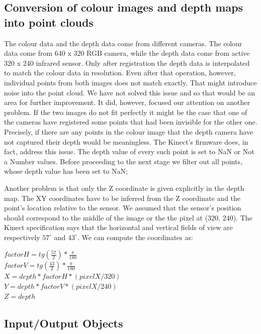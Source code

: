 	\subsection{Conversion of colour images and depth maps into point clouds}
	
		The colour data and the depth data come from different cameras. The colour data come from 640 x 320 RGB camera, while the depth data come from active 320 x 240 infrared sensor. Only after registration the depth data is interpolated to match the colour data in resolution. Even after that operation, however, individual points from both images does not match exactly. That might introduce noise into the point cloud. We have not solved this issue and so that would be an area for further improvement. It did, however, focused our attention on another problem. If the two images do not fit perfectly it might be the case that one of the cameras have registered some points that had been invisible for the other one. Precisely, if there are any points in the colour image that the depth camera have not captured their depth would be meaningless. The Kinect's firmware does, in fact, address this issue. The depth value of every such point is set to NaN or Not a Number values. Before proceeding to the next stage we filter out all points, whose depth value has been set to NaN;
		
		Another problem is that only the Z coordinate is given explicitly in the depth map. The XY coordinates have to be inferred from the Z coordinate and the point's location relative to the sensor. We assumed that the sensor's position should correspond to the middle of the image or the the pixel at (320, 240). The Kinect specification says that the horizontal and vertical fields of view are respectively $57^{\circ}$ and $43^{\circ}$. We can compute the coordinates as: \\
		
		\begin{centering}
			$factorH = tg (\frac{57}{2}) * \frac{\pi}{180}$\\
			$factorV = tg (\frac{43}{2}) * \frac{\pi}{180}$\\
			$X = depth * factorH * (pixelX / 320)$\\
			$Y = depth * factorV * (pixelX / 240)$\\
			$Z = depth$\\
		\end{centering}
		
	\subsection{Input/Output Objects}
	

